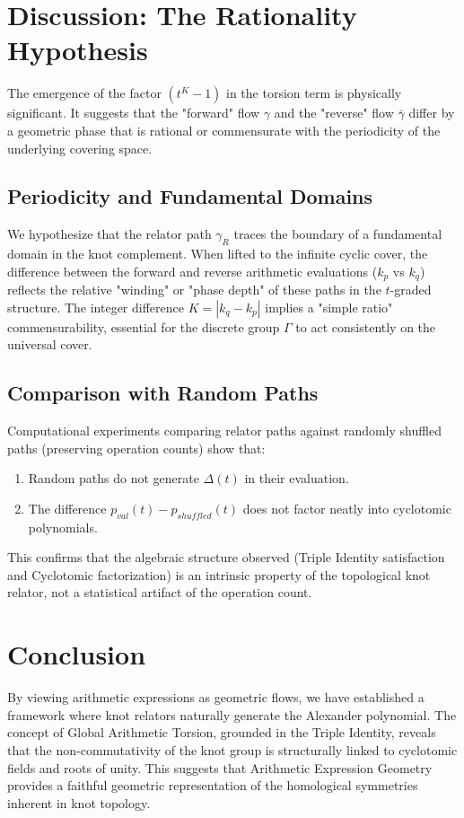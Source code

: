 \documentclass[a4paper,12pt]{article}
\begin{document}
\section{Discussion: The Rationality Hypothesis}

The emergence of the factor $(t^K-1)$ in the torsion term is physically significant. It suggests that the "forward" flow $\gamma$ and the "reverse" flow $\bar{\gamma}$ differ by a geometric phase that is rational or commensurate with the periodicity of the underlying covering space.

\subsection{Periodicity and Fundamental Domains}
We hypothesize that the relator path $\gamma_R$ traces the boundary of a fundamental domain in the knot complement. When lifted to the infinite cyclic cover, the difference between the forward and reverse arithmetic evaluations ($k_p$ vs $k_q$) reflects the relative "winding" or "phase depth" of these paths in the $t$-graded structure. The integer difference $K = |k_q - k_p|$ implies a "simple ratio" commensurability, essential for the discrete group $\Gamma$ to act consistently on the universal cover.

\subsection{Comparison with Random Paths}
Computational experiments comparing relator paths against randomly shuffled paths (preserving operation counts) show that:
\begin{enumerate}
    \item Random paths do not generate $\Delta(t)$ in their evaluation.
    \item The difference $p_{val}(t) - p_{shuffled}(t)$ does not factor neatly into cyclotomic polynomials.
\end{enumerate}
This confirms that the algebraic structure observed (Triple Identity satisfaction and Cyclotomic factorization) is an intrinsic property of the topological knot relator, not a statistical artifact of the operation count.

\section{Conclusion}
By viewing arithmetic expressions as geometric flows, we have established a framework where knot relators naturally generate the Alexander polynomial. The concept of Global Arithmetic Torsion, grounded in the Triple Identity, reveals that the non-commutativity of the knot group is structurally linked to cyclotomic fields and roots of unity. This suggests that Arithmetic Expression Geometry provides a faithful geometric representation of the homological symmetries inherent in knot topology.
\end{document}
